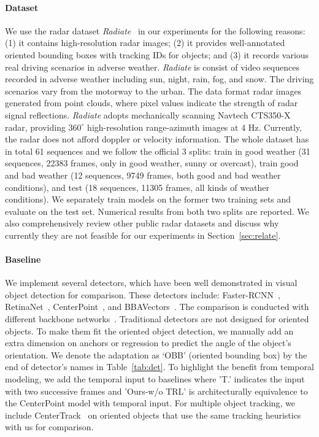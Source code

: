 \documentclass[10pt,twocolumn,letterpaper]{article}
\begin{document}
\paragraph{Dataset} We use the radar dataset \textit{Radiate}~\cite{sheeny2020radiate} in our experiments for the following reasons: (1) it contains high-resolution radar images; (2) it provides well-annotated oriented bounding boxes with tracking IDs for objects; and (3) it records various real driving scenarios in adverse weather. \textit{Radiate} is consist of video sequences recorded in adverse weather including sun, night, rain, fog, and snow. The driving scenarios vary from the motorway to the urban. The data format radar images generated from point clouds, where pixel values indicate the strength of radar signal reflections. \textit{Radiate} adopts mechanically scanning Navtech CTS350-X radar, providing $360^{\circ}$ high-resolution range-azimuth images at 4 Hz. Currently, the radar does not afford doppler or velocity information. The whole dataset has in total 61 sequences and we follow the official 3 splits: train in good weather (31 sequences, 22383 frames, only in good weather, sunny or overcast), train good and bad weather (12 sequences, 9749 frames, both good and bad weather conditions), and test (18 sequences, 11305 frames, all kinds of weather conditions). We separately train models on the former two training sets and evaluate on the test set. Numerical results from both two splits are reported. We also comprehensively review other public radar datasets and discuss why currently they are not feasible for our experiments in Section~\ref{sec:relate}.

\vspace{-5mm}
\paragraph{Baseline} We implement several detectors, which have been well demonstrated in visual object detection for comparison. These detectors include: Faster-RCNN~\cite{ren2015faster}, RetinaNet~\cite{lin2017focal}, CenterPoint~\cite{zhou2019objects}, and BBAVectors~\cite{yi2021oriented}. The comparison is conducted with different backbone networks~\cite{he2016deep,tan2019efficientnet}. Traditional detectors are not designed for oriented objects. To make them fit the oriented object detection, we manually add an extra dimension on anchors or regression to predict the angle of the object's orientation. We denote the adaptation as `OBB' (oriented bounding box) by the end of detector's names in Table~\ref{tab:det}. To highlight the benefit from temporal modeling, we add the temporal input to baselines where 'T.' indicates the input with two successive frames and 'Ours-w/o TRL' is architecturally equivalence to the CenterPoint model with temporal input. For multiple object tracking, we include CenterTrack~\cite{zhou2020tracking} on oriented objects that use the same tracking heuristics with us for comparison.
\end{document}
